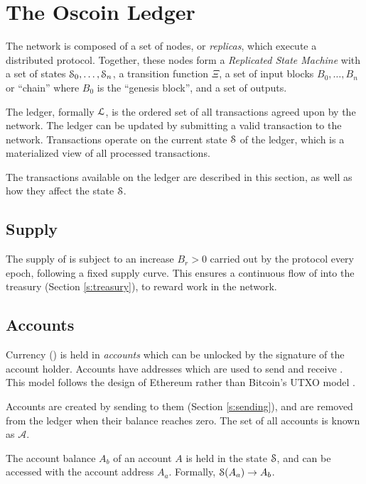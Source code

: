 \section{The Oscoin Ledger}
\label{s:ledger}

The \oscoin{} network is composed of a set of nodes, or \emph{replicas}, which
execute a distributed protocol. Together, these nodes form a \emph{Replicated
State Machine} with a set of states $\mathcal{S}_0, \ldots, \mathcal{S}_n$, a transition
function $\Xi$, a set of input blocks $B_0, \ldots, B_n$ or ``chain'' where
$B_0$ is the ``genesis block'', and a set of outputs.

The \oscoin{} ledger, formally $\mathcal{L}$, is the ordered set of all
transactions agreed upon by the network. The ledger can be updated by submitting
a valid transaction to the network. Transactions operate on the current state
$\mathcal{S}$ of the ledger, which is a materialized view of all processed transactions.

The transactions available on the ledger are described in this section, as well
as how they affect the state $\mathcal{S}$.

\subsection{Supply}

The supply of \oscoin{} is subject to an increase $B_r > 0$ carried out by the
protocol every epoch, following a fixed supply curve. This ensures a continuous
flow of \oscoin{} into the treasury (Section \ref{s:treasury}), to reward work
in the network.

\subsection{Accounts}
\label{s:accounts}

Currency (\oscoin{}) is held in \emph{accounts} which can be unlocked by the
signature of the account holder. Accounts have addresses which are used to send
and receive \oscoin{}. This model follows the design of Ethereum \cite{ethereum}
rather than Bitcoin's UTXO model \cite{bitcoin}.

Accounts are created by sending \oscoin{} to them (Section \ref{s:sending}),
and are removed from the ledger when their balance reaches zero. The set of all
accounts is known as $\mathcal{A}$.

The account balance $A_b$ of an account $A$ is held in the state $\mathcal{S}$, and
can be accessed with the account address $A_a$. Formally, $\mathcal{S}(A_a) \to A_b$.

